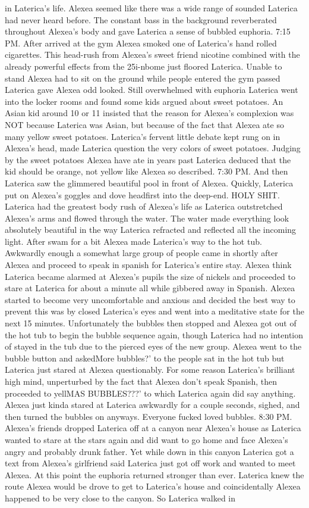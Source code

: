 \documentclass[12pt]{book}
\begin{document}
in Laterica's life. Alexea seemed like there was a wide range of sounded Laterica had never heard before. The constant bass in the background reverberated throughout Alexea's body and gave Laterica a sense of bubbled euphoria. 7:15 PM. After arrived at the gym Alexea smoked one of Laterica's hand rolled cigarettes. This head-rush from Alexea's sweet friend nicotine combined with the already powerful effects from the 25i-nbome just floored Laterica. Unable to stand Alexea had to sit on the ground while people entered the gym passed Laterica gave Alexea odd looked. Still overwhelmed with euphoria Laterica went into the locker rooms and found some kids argued about sweet potatoes. An Asian kid around 10 or 11 insisted that the reason for Alexea's complexion was NOT because Laterica was Asian, but because of the fact that Alexea ate so many yellow sweet potatoes. Laterica's fervent little debate kept rung on in Alexea's head, made Laterica question the very colors of sweet potatoes. Judging by the sweet potatoes Alexea have ate in years past Laterica deduced that the kid should be orange, not yellow like Alexea so described. 7:30 PM. And then Laterica saw the glimmered beautiful pool in front of Alexea. Quickly, Laterica put on Alexea's goggles and dove headfirst into the deep-end. HOLY SHIT. Laterica had the greatest body rush of Alexea's life as Laterica outstretched Alexea's arms and flowed through the water. The water made everything look absolutely beautiful in the way Laterica refracted and reflected all the incoming light. After swam for a bit Alexea made Laterica's way to the hot tub. Awkwardly enough a somewhat large group of people came in shortly after Alexea and proceed to speak in spanish for Laterica's entire stay. Alexea think Laterica became alarmed at Alexea's pupils the size of nickels and proceeded to stare at Laterica for about a minute all while gibbered away in Spanish. Alexea started to become very uncomfortable and anxious and decided the best way to prevent this was by closed Laterica's eyes and went into a meditative state for the next 15 minutes. Unfortunately the bubbles then stopped and Alexea got out of the hot tub to begin the bubble sequence again, though Laterica had no intention of stayed in the tub due to the pierced eyes of the new group. Alexea went to the bubble button and askedMore bubbles?' to the people sat in the hot tub but Laterica just stared at Alexea questionably. For some reason Laterica's brilliant high mind, unperturbed by the fact that Alexea don't speak Spanish, then proceeded to yellMAS BUBBLES???' to which Laterica again did say anything. Alexea just kinda stared at Laterica awkwardly for a couple seconds, sighed, and then turned the bubbles on anyways. Everyone fucked loved bubbles. 8:30 PM. Alexea's friends dropped Laterica off at a canyon near Alexea's house as Laterica wanted to stare at the stars again and did want to go home and face Alexea's angry and probably drunk father. Yet while down in this canyon Laterica got a text from Alexea's girlfriend said Laterica just got off work and wanted to meet Alexea. At this point the euphoria returned stronger than ever. Laterica knew the route Alexea would be drove to get to Laterica's house and coincidentally Alexea happened to be very close to the canyon. So Laterica walked in 
\end{document}
